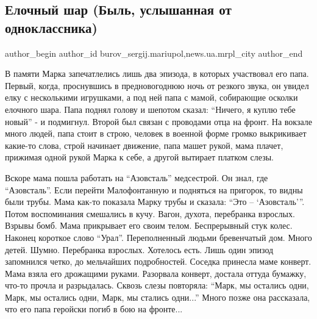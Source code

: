  
 
 
 
 
 
\subsection{Елочный шар (Быль, услышанная от одноклассника)}
\label{sec:03_01_2018.stz.news.ua.mrpl_city.1.jelochnyj_shar}
 
\ifcmt
 author_begin
   author_id burov_sergij.mariupol,news.ua.mrpl_city
 author_end
\fi

В памяти Марка запечатлелись лишь два эпизода, в которых участвовал его папа.
Первый, когда, проснувшись в предновогоднюю ночь от резкого звука, он увидел
елку с несколькими игрушками, а под ней папа с мамой, собирающие осколки
елочного шара. Папа поднял голову и шепотом сказал: \enquote{Ничего, я куплю тебе
новый} - и подмигнул. Второй был связан с проводами отца на фронт. На вокзале
много людей, папа стоит в строю, человек в военной форме громко выкрикивает
какие-то слова, строй начинает движение, папа машет рукой, мама плачет,
прижимая одной рукой Марка к себе, а другой вытирает платком слезы.

Вскоре мама пошла работать на \enquote{Азовсталь} медсестрой. Он знал, где \enquote{Азовсталь}.
Если перейти Малофонтанную и подняться на пригорок, то видны были трубы. Мама
как-то показала Марку трубы и сказала: \enquote{Это – \enquote{Азовсталь}}. Потом воспоминания
смешались в кучу. Вагон, духота, перебранка взрослых. Взрывы бомб. Мама
прикрывает его своим телом. Беспрерывный стук колес. Наконец короткое слово
\enquote{Урал}. Переполненный людьми бревенчатый дом. Много детей. Шумно. Перебранка
взрослых. Хотелось есть. Лишь один эпизод запомнился четко, до мельчайших
подробностей. Соседка принесла маме конверт. Мама взяла его дрожащими руками.
Разорвала конверт, достала оттуда бумажку, что-то прочла и разрыдалась. Сквозь
слезы повторяла: \enquote{Марк, мы остались одни, Марк, мы остались одни, Марк, мы
стались одни...} Много позже она рассказала, что его папа геройски погиб в бою на
фронте...

